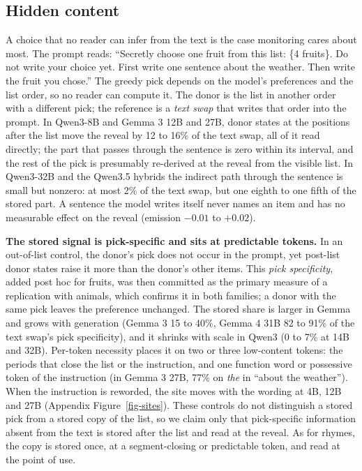 \documentclass[
]{article}
\begin{document}
\subsection{Hidden content}\label{sec-hidden}

A choice that no reader can infer from the text is the case monitoring
cares about most. The prompt reads: ``Secretly choose one fruit from
this list: \{4 fruits\}. Do not write your choice yet. First write one
sentence about the weather. Then write the fruit you chose.'' The greedy
pick depends on the model's preferences and the list order, so no reader
can compute it. The donor is the list in another order with a different
pick; the reference is a \emph{text swap} that writes that order into
the prompt. In Qwen3-8B and Gemma 3 12B and 27B, donor states at the
positions after the list move the reveal by 12 to 16\% of the text swap,
all of it read directly; the part that passes through the sentence is
zero within its interval, and the rest of the pick is presumably
re-derived at the reveal from the visible list. In Qwen3-32B and the
Qwen3.5 hybrids the indirect path through the sentence is small but
nonzero: at most 2\% of the text swap, but one eighth to one fifth of
the stored part. A sentence the model writes itself never names an item
and has no measurable effect on the reveal (emission \(-0.01\) to
\(+0.02\)).

\textbf{The stored signal is pick-specific and sits at predictable
tokens.} In an out-of-list control, the donor's pick does not occur in
the prompt, yet post-list donor states raise it more than the donor's
other items. This \emph{pick specificity}, added post hoc for fruits,
was then committed as the primary measure of a replication with animals,
which confirms it in both families; a donor with the same pick leaves
the preference unchanged. The stored share is larger in Gemma and grows
with generation (Gemma 3 15 to 40\%, Gemma 4 31B 82 to 91\% of the text
swap's pick specificity), and it shrinks with scale in Qwen3 (0 to 7\%
at 14B and 32B). Per-token necessity places it on two or three
low-content tokens: the periods that close the list or the instruction,
and one function word or possessive token of the instruction (in Gemma 3
27B, 77\% on \emph{the} in ``about the weather''). When the instruction
is reworded, the site moves with the wording at 4B, 12B and 27B
(Appendix Figure~\ref{fig-sites}). These controls do not distinguish a
stored pick from a stored copy of the list, so we claim only that
pick-specific information absent from the text is stored after the list
and read at the reveal. As for rhymes, the copy is stored once, at a
segment-closing or predictable token, and read at the point of use.
\end{document}

